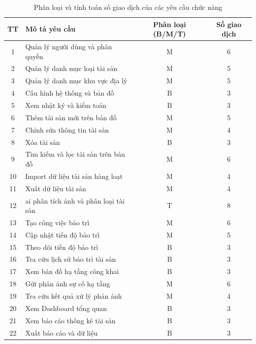 \begin{longtable}{|c|p{7.5cm}|c|c|}
\caption{Phân loại và tính toán số giao dịch của các yêu cầu chức năng} \label{tab:so_giao_dich} \\
\hline
\rowcolor{gray!25}
\textbf{TT} & \centering\textbf{Mô tả yêu cầu} & \centering\textbf{Phân loại (B/M/T)} & \textbf{Số giao dịch} \\ \hline
\endfirsthead

\hline
\endhead

\hline
\endfoot

\hline
\endlastfoot

1 & Quản lý người dùng và phân quyền & M & 6 \\ \hline
2 & Quản lý danh mục loại tài sản & M & 5 \\ \hline
3 & Quản lý danh mục khu vực địa lý & M & 5 \\ \hline
4 & Cấu hình hệ thống và bản đồ & B & 3 \\ \hline
5 & Xem nhật ký và kiểm toán & B & 3 \\ \hline
6 & Thêm tài sản mới trên bản đồ & M & 5 \\ \hline
7 & Chỉnh sửa thông tin tài sản & M & 4 \\ \hline
8 & Xóa tài sản & B & 3 \\ \hline
9 & Tìm kiếm và lọc tài sản trên bản đồ & M & 6 \\ \hline
10 & Import dữ liệu tài sản hàng loạt & M & 4 \\ \hline
11 & Xuất dữ liệu tài sản & M & 4 \\ \hline
12 & \gls{ai} phân tích ảnh và phân loại tài sản & T & 8 \\ \hline
13 & Tạo công việc bảo trì & M & 6 \\ \hline
14 & Cập nhật tiến độ bảo trì & M & 5 \\ \hline
15 & Theo dõi tiến độ bảo trì & B & 3 \\ \hline
16 & Tra cứu lịch sử bảo trì tài sản & B & 3 \\ \hline
17 & Xem bản đồ hạ tầng công khai & B & 3 \\ \hline
18 & Gửi phản ánh sự cố hạ tầng & M & 6 \\ \hline
19 & Tra cứu kết quả xử lý phản ánh & M & 4 \\ \hline
20 & Xem Dashboard tổng quan & B & 3 \\ \hline
21 & Xem báo cáo thống kê tài sản & B & 3 \\ \hline
22 & Xuất báo cáo và dữ liệu & B & 3 \\ 
\end{longtable}